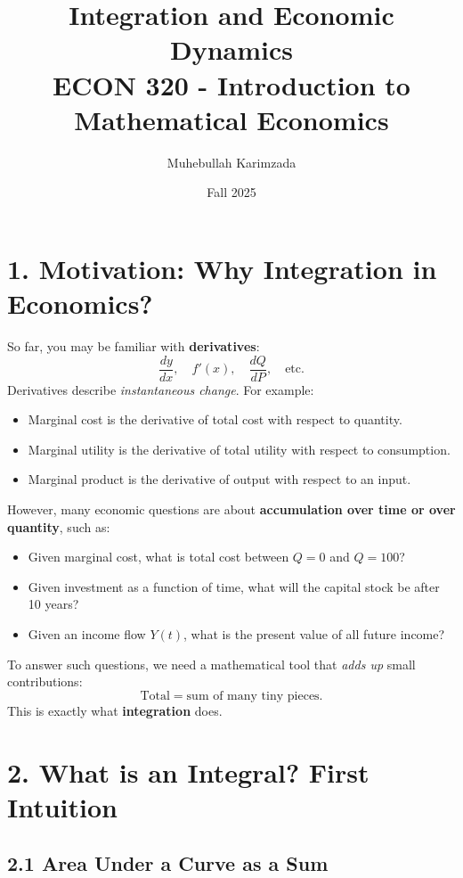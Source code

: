 \documentclass[12pt]{article}
\title{\textbf{Integration and Economic Dynamics}\\[7pt]
\large ECON 320 - Introduction to Mathematical Economics}
\author{Muhebullah Karimzada}
\date{Fall 2025}
\begin{document}
\maketitle





\section*{1. Motivation: Why Integration in Economics?}

So far, you may be familiar with \textbf{derivatives}: 
\[
\frac{dy}{dx}, \quad f'(x), \quad \frac{dQ}{dP}, \quad \text{etc.}
\]
Derivatives describe \emph{instantaneous change}. For example:
\begin{itemize}
\item Marginal cost is the derivative of total cost with respect to quantity.
\item Marginal utility is the derivative of total utility with respect to consumption.
\item Marginal product is the derivative of output with respect to an input.
\end{itemize}

However, many economic questions are about \textbf{accumulation over time or over quantity}, such as:
\begin{itemize}
\item Given marginal cost, what is total cost between $Q=0$ and $Q=100$?
\item Given investment as a function of time, what will the capital stock be after 10 years?
\item Given an income flow $Y(t)$, what is the present value of all future income?
\end{itemize}

To answer such questions, we need a mathematical tool that \emph{adds up} small contributions:
\[
\text{Total} = \text{sum of many tiny pieces}.
\]
This is exactly what \textbf{integration} does.



\section*{2. What is an Integral? First Intuition}

\subsection*{2.1 Area Under a Curve as a Sum}
\end{document}
